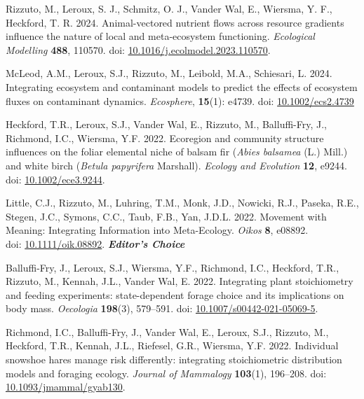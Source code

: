 \documentclass[11pt, letterpaper]{awesome-cv}
\begin{document}
\begin{etaremune}
  \renewcommand\labelenumi{\bfseries\theenumi .}
  \item \textcolor{awesome}{Rizzuto, M.}, Leroux, S. J., Schmitz, O. J., Vander Wal, E., Wiersma, Y. F., Heckford, T. R. 2024. Animal-vectored nutrient flows across resource gradients influence the nature of local and meta-ecosystem functioning. \emph{Ecological Modelling} \textbf{488}, 110570. doi: \href{https://doi.org/10.1016/j.ecolmodel.2023.110570}{10.1016/j.ecolmodel.2023.110570}.
  \item McLeod, A.M., Leroux, S.J., \textcolor{awesome}{Rizzuto, M.}, Leibold, M.A., Schiesari, L. 2024. Integrating ecosystem and contaminant models to predict the effects of ecosystem fluxes on contaminant dynamics. \emph{Ecosphere}, \textbf{15}(1): e4739. doi: \href{https://doi.org/10.1002/ecs2.4739}{10.1002/ecs2.4739}
  \item Heckford, T.R., Leroux, S.J., Vander Wal, E., \textcolor{awesome}{Rizzuto, M.}, Balluffi-Fry, J., Richmond, I.C., Wiersma, Y.F. 2022. Ecoregion and community structure influences on the foliar elemental niche of balsam fir (\textit{Abies balsamea} (L.) Mill.) and white birch (\textit{Betula papyrifera} Marshall). \emph{Ecology and Evolution} \textbf{12}, e9244. doi: \href{https://doi.org/10.1002/ece3.9244}{10.1002/ece3.9244}.
  \item Little, C.J.\textsuperscript{\textdagger}, \textcolor{awesome}{Rizzuto, M.}\textsuperscript{\textdagger}, Luhring, T.M., Monk, J.D., Nowicki, R.J., Paseka, R.E., Stegen, J.C., Symons, C.C., Taub, F.B., Yan, J.D.L. 2022. Movement with Meaning: Integrating Information into Meta-Ecology. \emph{Oikos} \textbf{8}, e08892.\\ doi: \href{https://doi.org/10.1111/oik.08892}{10.1111/oik.08892}. \null\hfill\textbf{\textit{Editor's Choice}}
  \item Balluffi-Fry, J., Leroux, S.J., Wiersma, Y.F., Richmond, I.C., Heckford, T.R., \textcolor{awesome}{Rizzuto, M.}, Kennah, J.L., Vander Wal, E. 2022. Integrating plant stoichiometry and feeding experiments: state-dependent forage choice and its implications on body mass. \emph{Oecologia} \textbf{198}(3), 579--591. doi: \href{https://rdcu.be/cAY5a}{10.1007/s00442-021-05069-5}.
  \item Richmond, I.C., Balluffi-Fry, J., Vander Wal, E., Leroux, S.J., \textcolor{awesome}{Rizzuto, M.}, Heckford, T.R., Kennah, J.L., Riefesel, G.R., Wiersma, Y.F. 2022. Individual snowshoe hares manage risk differently: integrating stoichiometric distribution models and foraging ecology. \emph{Journal of Mammalogy} \textbf{103}(1), 196--208. doi: \href{https://academic.oup.com/jmammal/advance-article/doi/10.1093/jmammal/gyab130/6441781?guestAccessKey=8f89e422-7fb9-4ce9-a9dc-ccf46f3dd0cc}{10.1093/jmammal/gyab130}.

\end{etaremune}
\end{document}
